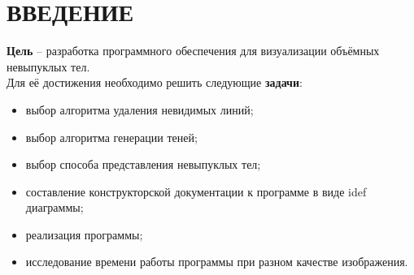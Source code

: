 \chapter*{ВВЕДЕНИЕ}
\textbf{ Цель } -- разработка программного обеспечения для визуализации
объёмных невыпуклых тел. \\
Для её достижения необходимо решить следующие \textbf{задачи}:
\begin{itemize}
    \item выбор алгоритма удаления невидимых линий;
    \item выбор алгоритма генерации теней;
    \item выбор способа представления невыпуклых тел;
    \item составление конструкторской документации к программе
    в виде idef диаграммы;
    \item реализация программы;
    \item исследование времени работы программы при разном качестве изображения.
\end{itemize}